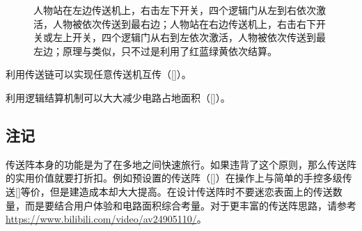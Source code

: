 \begin{figure}[!h]
\begin{center}
\qquad
{}
\end{center}
\caption{\protect{}人物站在左边传送机上，右击左下开关，四个逻辑门从左到右依次激活，人物被依次传送到最右边；人物站在右边传送机上，右击右下开关或左上开关，四个逻辑门从右到左依次激活，人物被依次传送到最左边；\protect{}原理与\protect{}类似，只不过是利用了红蓝绿黄依次结算。}
\label{i249:252}
\end{figure}

利用传送链可以实现任意传送机互传（\autoref{}）。

利用逻辑结算机制可以大大减少电路占地面积（\autoref{}）。

\subsection{注记}
传送阵本身的功能是为了在多地之间快速旅行。如果违背了这个原则，那么传送阵的实用价值就要打折扣。例如预设置的传送阵（\autoref{}）在操作上与简单的手控多级传送\autoref{}等价，但是建造成本却大大提高。在设计传送阵时不要迷恋表面上的传送数量，而是要结合用户体验和电路面积综合考量。对于更丰富的传送阵思路，请参考\url{https://www.bilibili.com/video/av24905110/}。

